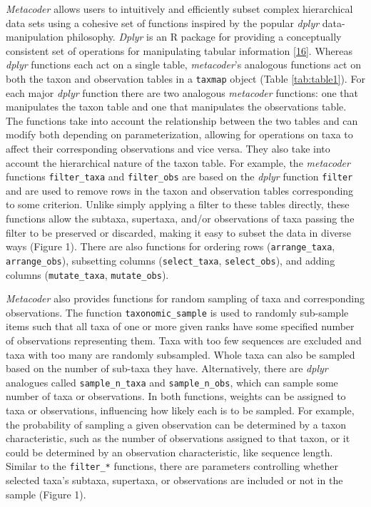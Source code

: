 \documentclass[10pt,letterpaper]{article}
\begin{document}
\emph{Metacoder} allows users to intuitively and efficiently subset
complex hierarchical data sets using a cohesive set of functions
inspired by the popular \emph{dplyr} data-manipulation philosophy.
\emph{Dplyr} is an R package for providing a conceptually consistent set
of operations for manipulating tabular information
\hyperref[csl:16]{[16]}. Whereas \emph{dplyr} functions each act on a
single table, \emph{metacoder}'s analogous functions act on both the
taxon and observation tables in a \texttt{taxmap} object (Table
\ref{tab:table1}). For each major \emph{dplyr} function there are two
analogous \emph{metacoder} functions: one that manipulates the taxon
table and one that manipulates the observations table. The functions
take into account the relationship between the two tables and can modify
both depending on parameterization, allowing for operations on taxa to
affect their corresponding observations and vice versa. They also take
into account the hierarchical nature of the taxon table. For example,
the \emph{metacoder} functions \texttt{filter\_taxa} and
\texttt{filter\_obs} are based on the \emph{dplyr} function
\texttt{filter} and are used to remove rows in the taxon and observation
tables corresponding to some criterion. Unlike simply applying a filter
to these tables directly, these functions allow the subtaxa, supertaxa,
and/or observations of taxa passing the filter to be preserved or
discarded, making it easy to subset the data in diverse ways (Figure 1).
There are also functions for ordering rows (\texttt{arrange\_taxa},
\texttt{arrange\_obs}), subsetting columns (\texttt{select\_taxa},
\texttt{select\_obs}), and adding columns (\texttt{mutate\_taxa},
\texttt{mutate\_obs}).

\emph{Metacoder} also provides functions for random sampling of taxa and
corresponding observations. The function \texttt{taxonomic\_sample} is
used to randomly sub-sample items such that all taxa of one or more
given ranks have some specified number of observations representing
them. Taxa with too few sequences are excluded and taxa with too many
are randomly subsampled. Whole taxa can also be sampled based on the
number of sub-taxa they have. Alternatively, there are \emph{dplyr}
analogues called \texttt{sample\_n\_taxa} and \texttt{sample\_n\_obs},
which can sample some number of taxa or observations. In both functions,
weights can be assigned to taxa or observations, influencing how likely
each is to be sampled. For example, the probability of sampling a given
observation can be determined by a taxon characteristic, such as the
number of observations assigned to that taxon, or it could be determined
by an observation characteristic, like sequence length. Similar to the
\texttt{filter\_*} functions, there are parameters controlling whether
selected taxa's subtaxa, supertaxa, or observations are included or not
in the sample (Figure 1).
\end{document}
